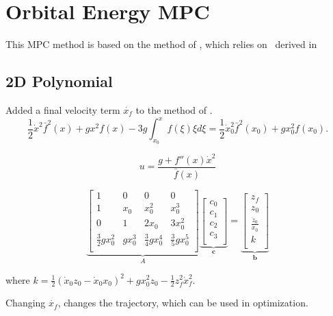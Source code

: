 %
\chapter{Orbital Energy MPC}
This \ac{MPC} method is based on the method of \cite{koolen2016balance}, which relies on \Eorbit~derived in \cite{pratt2007derivation}
\section{2D Polynomial}
Added a final velocity term $\dot{x_f}$ to the method of \cite{koolen2016balance}.
\begin{equation}
    \frac{1}{2}\dot{x}^2\bar{f}^2(x)+gx^2f(x) - 3g\int_{x_0}^xf(\xi)\xi d\xi = \frac{1}{2}\dot{x}_0^2\bar{f}^2(x_0)+gx_0^2f(x_0).
\end{equation}

\begin{equation}
    u = \frac{g + f''(x)\dot{x}^2}{\bar{f}(x)}
\end{equation}

\begin{equation}
    \underbrace{\begin{bmatrix}1 & 0 & 0 & 0 \\ 
     1 & x_0 & x_0^2 & x_0^3\\
     0 & 1 & 2x_0 & 3x_0^2\\
     \frac{3}{2}gx_0^2 & gx_0^3 & \frac{3}{4}gx_0^4 & \frac{3}{5}gx_0^5\\
     \end{bmatrix}}_A
     \underbrace{\begin{bmatrix}
     c_0\\
     c_1\\
     c_2\\
     c_3\\
     \end{bmatrix}}_{\boldsymbol{c}}=
     \underbrace{\begin{bmatrix}
     z_f\\
     z_0\\
     \frac{\dot{z}_0}{\dot{x}_0}\\
     k\\
     \end{bmatrix}}_{\boldsymbol{b}}
\end{equation}

where $k=\frac{1}{2}(\dot{x}_0z_0-\dot{x}_0x_0)^2 + gx_0^2z_0 - \frac{1}{2}z_f^2\dot{x}_f^2$.

Changing $\dot{x_f}$, changes the trajectory, which can be used in optimization.

